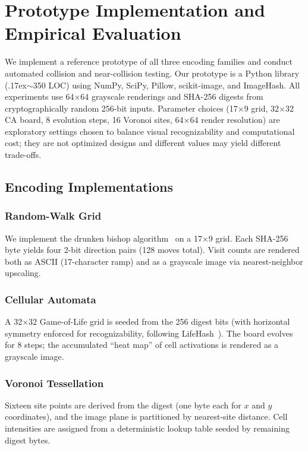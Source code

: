 \documentclass[conference,10pt]{IEEEtran}
\begin{document}
\section{Prototype Implementation and Empirical Evaluation}
\label{sec:analysis}

We implement a reference prototype of all three encoding families and conduct automated collision and near-collision testing.
Our prototype is a Python library ({\raise.17ex\hbox{$\scriptstyle\sim$}}350 LOC) using NumPy, SciPy, Pillow, scikit-image, and ImageHash.
All experiments use 64$\times$64 grayscale renderings and SHA-256 digests from cryptographically random 256-bit inputs.
Parameter choices (17$\times$9 grid, 32$\times$32 CA board, 8 evolution steps, 16 Voronoi sites, 64$\times$64 render resolution) are exploratory settings chosen to balance visual recognizability and computational cost; they are not optimized designs and different values may yield different trade-offs.

\subsection{Encoding Implementations}

\subsubsection{Random-Walk Grid}
We implement the drunken bishop algorithm~\cite{loss2009drunken} on a 17$\times$9 grid.
Each SHA-256 byte yields four 2-bit direction pairs (128 moves total).
Visit counts are rendered both as ASCII (17-character ramp) and as a grayscale image via nearest-neighbor upscaling.

\subsubsection{Cellular Automata}
A 32$\times$32 Game-of-Life grid is seeded from the 256 digest bits (with horizontal symmetry enforced for recognizability, following LifeHash~\cite{lifehash2021}).
The board evolves for 8 steps; the accumulated ``heat map'' of cell activations is rendered as a grayscale image.

\subsubsection{Voronoi Tessellation}
Sixteen site points are derived from the digest (one byte each for $x$ and $y$ coordinates), and the image plane is partitioned by nearest-site distance.
Cell intensities are assigned from a deterministic lookup table seeded by remaining digest bytes.
\end{document}
